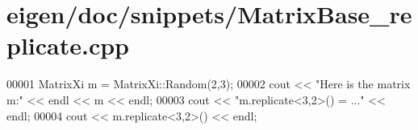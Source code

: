 \hypertarget{eigen_2doc_2snippets_2_matrix_base__replicate_8cpp_source}{}\section{eigen/doc/snippets/\+Matrix\+Base\+\_\+replicate.cpp}
\label{eigen_2doc_2snippets_2_matrix_base__replicate_8cpp_source}

\begin{DoxyCode}
00001 MatrixXi m = MatrixXi::Random(2,3);
00002 cout << \textcolor{stringliteral}{"Here is the matrix m:"} << endl << m << endl;
00003 cout << \textcolor{stringliteral}{"m.replicate<3,2>() = ..."} << endl;
00004 cout << m.replicate<3,2>() << endl;
\end{DoxyCode}
